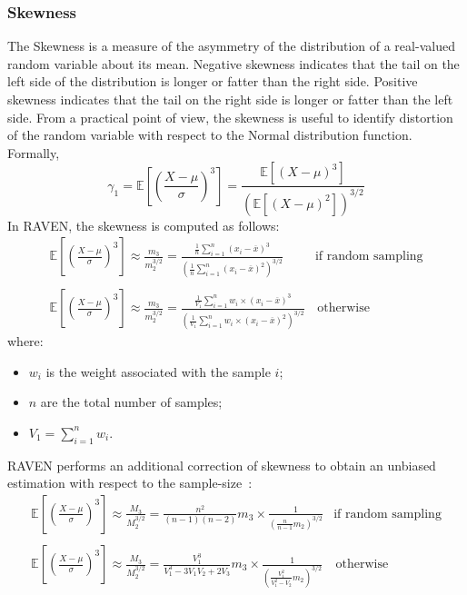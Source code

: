 \subsubsection{Skewness}
The Skewness is a measure of the asymmetry of the distribution of a 
real-valued random variable about its mean. Negative skewness 
indicates that the tail on the left side of the distribution is longer or fatter 
than the right side.  Positive skewness indicates that the tail on the right 
side is longer or fatter than the left side. From a practical point of view, the 
skewness is useful to identify distortion  of the random variable with respect to
the Normal distribution function.
\\Formally, 
\begin{equation}
\gamma_{1} = \mathbb{E} \left [ \left ( \frac{X-\mu}{\sigma} \right )^{3} \right ] = \frac{ \mathbb{E}\left [ \left ( X-\mu \right )^{3} \right ]}{\left ( \mathbb{E}\left [ \left ( X-\mu \right )^{2} \right ] \right )^{3/2}}
\end{equation}
In RAVEN, the skewness is computed as follows:
\begin{equation}
\begin{matrix}
\mathbb{E} \left [ \left ( \frac{X-\mu}{\sigma} \right )^{3} \right ]  \approx \frac{m_{3}}{m_{2}^{3/2}} = \frac{  \frac{1}{n} \sum_{i=1}^{n}  (x_{i} - \overline{x})^{3} }{\left ( \frac{1}{n} \sum_{i=1}^{n}  (x_{i} - \overline{x})^{2} \right )^{3/2}} & \text{if random sampling}
\\
\\
\mathbb{E} \left [ \left ( \frac{X-\mu}{\sigma} \right )^{3} \right ]  \approx \frac{m_{3}}{m_{2}^{3/2}} = \frac{  \frac{1}{V_{1}} \sum_{i=1}^{n} w_{i} \times (x_{i} - \overline{x})^{3} }{\left ( \frac{1}{V_{1}} \sum_{i=1}^{n}  w_{i} \times (x_{i} - \overline{x})^{2} \right )^{3/2}} &  \, \text{otherwise}
\end{matrix}
\end{equation}
where:
\begin{itemize}
  \item $w_{i}$ is the weight associated with the sample $i$;
  \item $n$ are the total number of samples;
  \item $V_{1} = \sum_{i=1}^{n} w_{i}$.
\end{itemize}
RAVEN performs an additional correction of skewness to obtain an unbiased estimation  with respect to the sample-size~\cite{RimoldiniUnbiased}:
\begin{equation}
\begin{matrix}
\mathbb{E} \left [ \left ( \frac{X-\mu}{\sigma} \right )^{3} \right ]  \approx \frac{M_{3}}{M_{2}^{3/2}}  = \displaystyle \frac{n^{2}}{(n-1)(n-2)}m_{3}\times \frac{1}{\left ( \displaystyle \frac{n}{n-1}m_{2}  \right )^{3/2}} & \text{if random sampling}  
\\
\\
\mathbb{E} \left [ \left ( \frac{X-\mu}{\sigma} \right )^{3} \right ]  \approx \frac{M_{3}}{M_{2}^{3/2}}  = \displaystyle \frac{V_{1}^{3}}{V_{1}^{3}-3V_{1}V_{2}+2V_{3}}m_{3} \times \frac{1}{\left ( \displaystyle \frac{V_{1}^{2}}{V_{1}^{2}-V_{2}}m_{2}  \right )^{3/2}} &  \,  \text{otherwise}
\end{matrix}
\end{equation}
